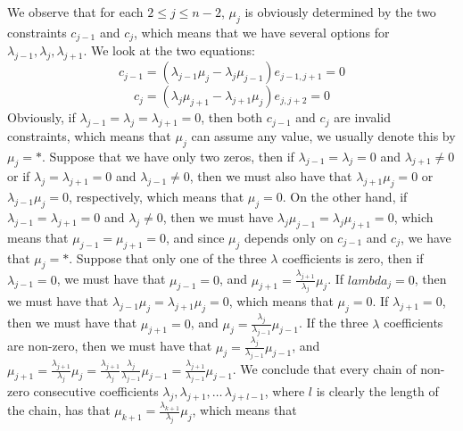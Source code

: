 \documentclass[12pt]{article}
\begin{document}
We observe that for each $2\leq j\leq n-2$, $\mu_j$ is obviously determined by the two constraints $c_{j-1}$ and $c_j$, which means that we have several options for $\lambda_{j-1},\lambda_j,\lambda_{j+1}$. We look at the two equations: \[
c_{j-1}=(\lambda_{j-1}\mu_j-\lambda_j\mu_{j-1})e_{j-1,j+1}=0
\]\[
c_j=(\lambda_j\mu_{j+1}-\lambda_{j+1}\mu_j)e_{j,j+2}=0
\]
Obviously, if $\lambda_{j-1}=\lambda_j=\lambda_{j+1}=0$, then both $c_{j-1}$ and $c_j$ are invalid constraints, which means that $\mu_j$ can assume any value, we usually denote this by $\mu_j=\ast$.
Suppose that we have only two zeros, then if $\lambda_{j-1}=\lambda_j=0$ and $\lambda_{j+1}\neq 0$ or if $\lambda_j=\lambda_{j+1}=0$ and $\lambda_{j-1}\neq 0$, then we must also have that $\lambda_{j+1}\mu_j=0$ or $\lambda_{j-1}\mu_j=0$, respectively, which means that $\mu_j=0$. On the other hand, if $\lambda_{j-1}=\lambda_{j+1}=0$ and $\lambda_j\neq 0$, then we must have $
\lambda_j\mu_{j-1}=\lambda_j\mu_{j+1}=0$, which means that $\mu_{j-1}=\mu_{j+1}=0$, and since $\mu_j$ depends only on $c_{j-1}$ and $c_j$, we have that $\mu_j=\ast$.
Suppose that only one of the three $\lambda$ coefficients is zero, then if $\lambda_{j-1}=0$, we must have that $\mu_{j-1}=0$, and $\mu_{j+1}=\frac{\lambda_{j+1}}{\lambda_j}\mu_j$. If $lambda_j=0$, then we must have that $\lambda_{j-1}\mu_j=\lambda_{j+1}\mu_j=0$, which means that $\mu_j=0$. If $\lambda_{j+1}=0$, then we must have that $\mu_{j+1}=0$, and $\mu_j=\frac{\lambda_j}{\lambda_{j-1}}\mu_{j-1}$. If the three $\lambda$ coefficients are non-zero, then we must have that $\mu_j=\frac{\lambda_j}{\lambda_{j-1}}\mu_{j-1}$, and $\mu_{j+1}=\frac{\lambda_{j+1}}{\lambda_j}\mu_j=\frac{\lambda_{j+1}}{\lambda_j}\frac{\lambda_j}{\lambda_{j-1}}\mu_{j-1}=\frac{\lambda_{j+1}}{\lambda_{j-1}}\mu_{j-1}$. We conclude that every chain of non-zero consecutive coefficients $\lambda_j,\lambda_{j+1},\dots\,\lambda_{j+l-1}$, where $l$ is clearly the length of the chain, has that $\mu_{k+1}=\frac{\lambda_{k+1}}{\lambda_j}\mu_j$, which means that 
\end{document}
